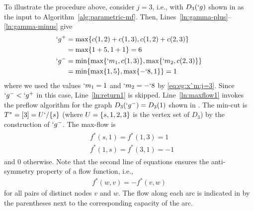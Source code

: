 \documentclass[conference,letterpaper]{IEEEtran}
\begin{document}
To illustrate the procedure above, consider $j=3$, i.e., with $D_3(`g)$ shown in
as the input to Algorithm~\ref{alg:parametric-mf}. Then, Lines~\ref{ln:gamma-plus}--\ref{ln:gamma-minus} give
\begin{align*}
	`g^+ &= \max \{ c(1,2)+c(1,3), c(1,2)+c(2,3) \}\\
	&= \max \{1+5,1+1\} = 6\\
	`g^-&= \min \{\max \{`m_1, c(1,3)\}, \max \{`m_2, c(2,3)\} \}\\
	&= \min \{\max \{1, 5\}, \max \{-`8,1\} \} = 1
\end{align*}
where we used the values $`m_1=1$ and $`m_2=-`8$ by \eqref{eq:eg:x`m:j=3}. Since $`g^-<`g^+$ in this
case, Line~\ref{ln:return1} is skipped. Line~\ref{ln:maxflow1} invokes the preflow algorithm for the
graph $D_3(`g^-)=D_3(1)$ shown in . The min-cut is $T^*=[3]=U`/\{s\}$ (where
$U=\{s,1,2,3\}$ is the vertex set of $D_3$) by the construction of $`g^-$. The max-flow is
\begin{align}
	\begin{split}
		&f^*(s,1)=f^*(1,3)=1\\
		&f^*(1,s)=f^*(3,1)=-1
	\end{split}
\end{align}
and $0$ otherwise. Note that the second line of equations ensures the anti-symmetry property of a
flow function, i.e., 
\begin{align}
	f^*(w,v)=-f^*(v,w) \label{eq:anti-symmetry}
\end{align}
for all pairs of distinct nodes $v$ and $w$. The flow along each arc is indicated  in
 by the parentheses next to the corresponding capacity of the arc.
\end{document}
